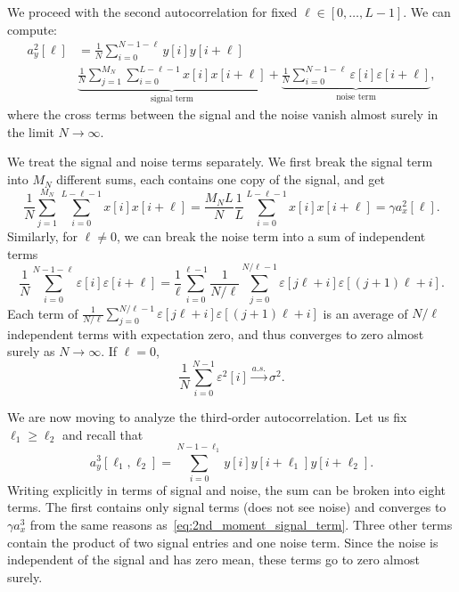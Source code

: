 \documentclass[english,11pt]{article}
\numberwithin{equation}{section}
\theoremstyle{plain}
\theoremstyle{definition}
\theoremstyle{remark}
\theoremstyle{plain}
\theoremstyle{remark}
\theoremstyle{plain}
\theoremstyle{plain}
\begin{document}
We proceed with the second autocorrelation for fixed $\ell\in[0,\ldots,L-1]$. We can compute:
\begin{equation}
\begin{split}
a_y^2[\ell] & = \frac{1}{N}\sum_{i=0}^{N-1-\ell}y[i]y[i+\ell] \\
& \underbrace{\frac{1}{N}\sum_{j=1}^{M_N}\sum_{i=0}^{L-\ell-1}x[i]x[i+\ell]}_{\text{signal term}} + \underbrace{\frac{1}{N}\sum_{i=0}^{N-1-\ell}\varepsilon[i]\varepsilon[i+\ell]}_{\text{noise term}},
\end{split}
\end{equation}
where the cross terms between the signal and the noise vanish  almost surely in the limit $N\to\infty$. 

We treat the signal and noise terms separately. We first break the signal term into $M_N$ different sums, each contains one copy of the signal, and get
\begin{equation} \label{eq:2nd_moment_signal_term}
\frac{1}{N}\sum_{j=1}^{M_N}\sum_{i=0}^{L-\ell-1}x[i]x[i+\ell] = \frac{M_NL}{N}\frac{1}{L}\sum_{i=0}^{L-\ell-1}x[i]x[i+\ell] = \gamma a_x^2[\ell].
\end{equation}
Similarly, for $\ell\neq 0$, we can break the noise term into a sum of independent terms 
\begin{equation}
\frac{1}{N}\sum_{i=0}^{N-1-\ell} \varepsilon[i]\varepsilon[i+\ell] = \frac{1}{\ell}\sum_{i=0}^{\ell-1}\frac{1}{N/\ell}\sum_{j=0}^{N/\ell -1} \varepsilon[j\ell + i] \varepsilon[(j+1)\ell + i].
\end{equation}
Each term of $\frac{1}{N/\ell}\sum_{j=0}^{N/\ell -1} \varepsilon[j\ell + i] \varepsilon[(j+1)\ell + i]$ is an average of $N/\ell$ independent terms with expectation zero, and thus converges to zero almost surely as $N\to\infty$.
If $\ell=0$, 
\begin{equation}
\frac{1}{N}\sum_{i=0}^{N-1} \varepsilon^2[i] \xrightarrow{a.s.} \sigma^2.
\end{equation}

We are now moving to analyze the third-order autocorrelation. Let us fix $\ell_1\geq\ell_2$ and recall that 
\begin{equation*}
a_y^3[\ell_1,\ell_2] = \sum_{i=0}^{N-1-\ell_1} y[i]y[i+\ell_1]y[i+\ell_2]. 
\end{equation*}
Writing explicitly in terms of signal and noise, the sum can be broken into eight terms. The first contains only signal terms (does not see noise) and converges to $\gamma a_x^3$ from the same reasons as~\eqref{eq:2nd_moment_signal_term}. Three other terms contain the product of two signal entries and one noise term. Since the noise is independent of the signal and has zero mean, these terms go to zero almost surely.
\end{document}
